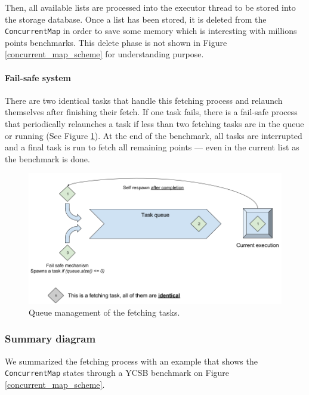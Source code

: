 \documentclass[a4paper,11pt]{report}
\begin{document}
Then, all available lists are processed into the executor thread to be stored into the storage database. Once a list has been stored, it is deleted from the \texttt{ConcurrentMap} in order to save some memory which is interesting with millions points benchmarks. This delete phase is not shown in Figure \ref{concurrent_map_scheme} for understanding purpose.


\paragraph{Fail-safe system}

There are two identical tasks that handle this fetching process and relaunch themselves after finishing their fetch. If one task fails, there is a fail-safe process that periodically relaunches a task if less than two fetching tasks are in the queue or running (See Figure \ref{queue_management_report}). At the end of the benchmark, all tasks are interrupted and a final task is run to fetch all remaining points --- even in the current list as the benchmark is done.

\begin{figure}[ht]
\begin{center}
\includegraphics[width=1\linewidth]{images/queue_management_report.png}
\caption{Queue management of the fetching tasks.}
\label{queue_management_report}
\end{center}
\end{figure}

\clearpage
\subsubsection{Summary diagram}

We summarized the fetching process with an example that shows the \texttt{ConcurrentMap} states through a YCSB benchmark on Figure \ref{concurrent_map_scheme}.
\end{document}
